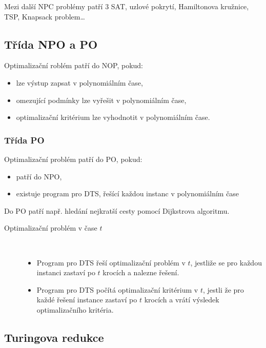 Mezi další NPC problémy patří 3 SAT, uzlové pokrytí, Hamiltonova kružnice, TSP, Knapsack problem\dots

\subsection{Třída NPO a PO}

Optimalizační roblém patří do NOP, pokud:

\begin{itemize}
    \item lze výstup zapsat v polynomiálním čase,
    \item omezující podmínky lze vyřešit v polynomiálním čase,
    \item optimalizační kritérium lze vyhodnotit v polynomiálním čase.
\end{itemize}

\subsubsection{Třída PO}

Optimalizační problém patří do PO, pokud:

\begin{itemize}
    \item patří do NPO,
    \item existuje program pro DTS, řešící každou instanc v polynomiálním čase
\end{itemize}

Do PO patří např. hledání nejkratší cesty pomocí Dijkstrova algoritmu.

\begin{description}
    \item[Optimalizační problém v čase $t$] \
    \begin{itemize}
        \item Program pro DTS řeší optimalizační problém v $t$, jestliže se pro každou instanci zastaví po $t$ krocích a nalezne řešení.
        \item Program pro DTS počítá optimalizační kritérium v $t$, jestli že pro každé řešení instance zastaví po $t$ krocích a vrátí výsledek optimalizačního kritéria.
    \end{itemize} 
\end{description}

\subsection{Turingova redukce}

